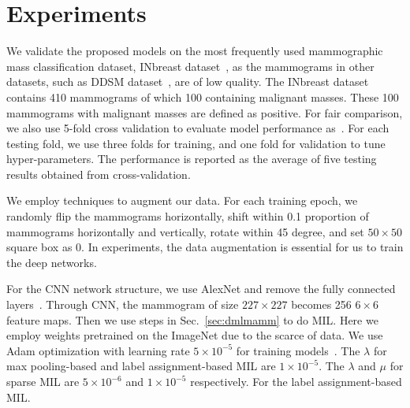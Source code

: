 \documentclass[runningheads,a4paper]{llncs}
\begin{document}
\section{Experiments}\label{sec:exp}
We validate the proposed models on the most frequently used mammographic mass classification dataset, INbreast dataset~\cite{moreira2012inbreast}, as the mammograms in other datasets, such as DDSM dataset~\cite{bowyer1996digital}, are of low quality. The INbreast dataset contains 410 mammograms of which 100 containing malignant masses. These 100 mammograms with malignant masses are defined as positive. For fair comparison, we also use 5-fold cross validation to evaluate model performance as~\cite{dhungel2016automated}. For each testing fold, we use three folds for training, and one fold for validation to tune hyper-parameters. The performance is reported as the average of five testing results obtained from cross-validation.

We employ techniques to augment our data. For each training epoch, we randomly flip the mammograms horizontally, shift within 0.1 proportion of mammograms horizontally and vertically, rotate within 45 degree, and set $50 \times 50$ square box as 0. In experiments, the data augmentation is essential for us to train the deep networks.

For the CNN network structure, we use AlexNet and remove the fully connected layers~\cite{krizhevsky2012imagenet}. Through CNN, the mammogram of size $227 \times 227$ becomes 256 $6 \times 6$ feature maps. Then we use steps in Sec.~\ref{sec:dmlmamm} to do MIL. Here we employ weights pretrained on the ImageNet due to the scarce of data. We use Adam optimization with learning rate $5 \times 10^{-5}$ for training models~\cite{ba2015adam}. The $\lambda$ for max pooling-based and label assignment-based MIL are $1 \times 10^{-5}$. The $\lambda$ and $\mu$ for sparse MIL are $5 \times 10^{-6}$ and $1 \times 10^{-5}$ respectively. For the label assignment-based MIL.%
\end{document}
